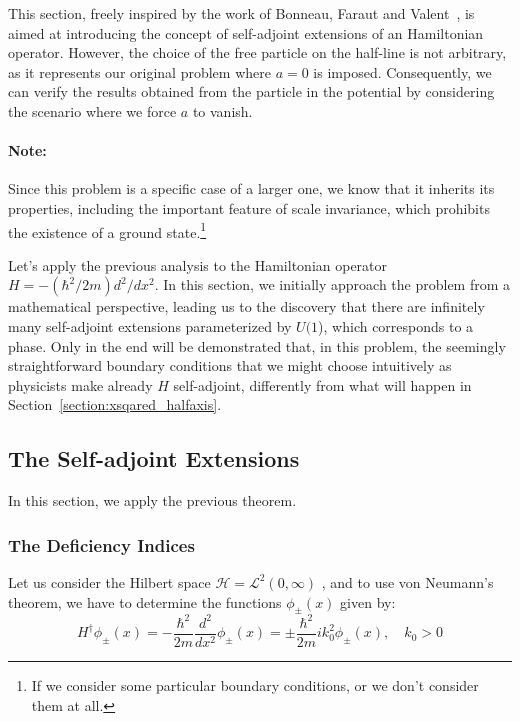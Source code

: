 This section, freely inspired by the work of Bonneau, Faraut and Valent~\cite{Bonneau_2001}, is aimed at introducing the concept of self-adjoint extensions of an Hamiltonian operator. 
However, the choice of the free particle on the half-line is not arbitrary, as it represents our original problem where $a = 0$ is imposed. Consequently, we can verify the results obtained from the particle in the potential by considering the scenario where we force $a$ to vanish.

\paragraph*{Note:}
Since this problem is a specific case of a larger one, we know that it inherits its properties, including the important feature of scale invariance, which prohibits the existence of a ground state.\footnote{If we consider some particular boundary conditions, or we don't consider them at all.}

\vspace{4mm}
\noindent
Let's apply the previous analysis to the Hamiltonian operator \(H = -(\hbar^2/2m)d^2/dx^2\).
In this section, we initially approach the problem from a mathematical perspective, leading us to the discovery that there are infinitely many self-adjoint extensions parameterized by \(U(1\)), which corresponds to a phase. Only in the end will be demonstrated that, in this problem, the seemingly straightforward boundary conditions that we might choose intuitively as physicists make already $H$ self-adjoint, differently from what will happen in Section~\ref{section:xsqared_halfaxis}.

\clearpage

\subsection{The Self-adjoint Extensions}
In this section, we apply the previous theorem.

\subsubsection*{The Deficiency Indices}

Let us consider the Hilbert space $\mathcal{H} = \mathcal{L}^2(0,\infty)$
, and to use von Neumann's theorem, we have to determine the functions $\phi_{\pm}(x)$ given by:
\begin{equation} \label{eq:free_H}
    H^\dagger \phi_{\pm}(x) = - \frac{\hbar^2}{2m} \frac{d^2}{dx^2} \phi_{\pm}(x) = \pm \frac{\hbar^2}{2m} ik^2_0 \phi_{\pm}(x), \quad k_0 > 0
\end{equation}

